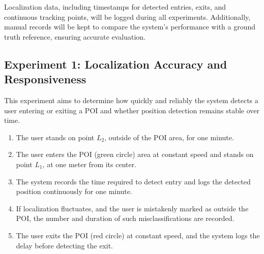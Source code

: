 Localization data, including timestamps for detected entries, exits, and continuous tracking points, will be logged during all experiments. Additionally, manual records will be kept to compare the system's performance with a ground truth reference, ensuring accurate evaluation.

\subsection{Experiment 1: Localization Accuracy and Responsiveness}

This experiment aims to determine how quickly and reliably the system detects a user entering or exiting a POI and whether position detection remains stable over time.

\begin{enumerate}
    \item The user stands on point $L_2$, outside of the POI area, for one minute.
    \item The user enters the POI (green circle) area at constant speed and stands on point $L_1$, at one meter from its center.
    \item The system records the time required to detect entry and logs the detected position continuously for one minute.
    \item If localization fluctuates, and the user is mistakenly marked as outside the POI, the number and duration of such misclassifications are recorded.
    \item The user exits the POI (red circle) at constant speed, and the system logs the delay before detecting the exit.
\end{enumerate}

